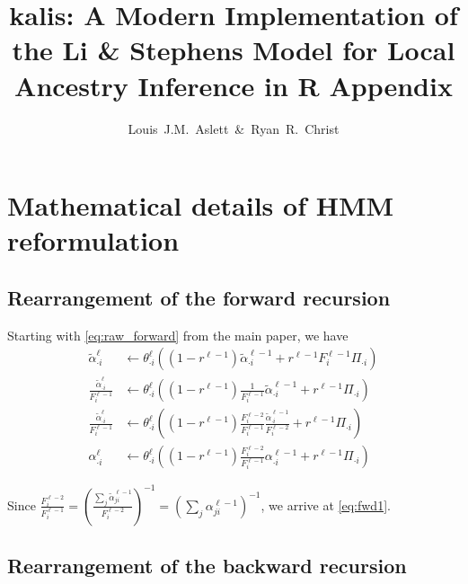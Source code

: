 \documentclass[a4paper]{article}
\title{kalis: A Modern Implementation of the Li \& Stephens Model for Local Ancestry Inference in R \newline Appendix}
\author{Louis~J.M.~Aslett~\&~Ryan~R.~Christ}
\date{}
\begin{document}
\maketitle
\appendix



\section{Mathematical details of HMM reformulation}
\label{mathematical-details-of-hmm-reformulation}



\subsection{Rearrangement of the forward recursion}
\label{apx:fwd}

Starting with \eqref{eq:raw_forward} from the main paper, we have
\begin{align}
	\tilde{\alpha}_{\cdot i}^{\ell} & \gets \theta^{\ell}_{\cdot i}  \left( \left(1-r^{\ell-1}\right) \tilde{\alpha}_{\cdot i}^{\ell-1} + r^{\ell-1} F_i^{\ell-1}  \Pi_{\cdot i} \right) \nonumber \\
	\frac{\tilde{\alpha}_{\cdot i}^{\ell}}{ F_i^{\ell-1}} & \gets \theta^{\ell}_{\cdot i} \left( \left(1-r^{\ell-1}\right) \frac{1}{{ F_i^{\ell-1}}}\tilde{\alpha}_{\cdot i}^{\ell-1} + r^{\ell-1} \Pi_{\cdot i} \right) \nonumber \\
	\frac{\tilde{\alpha}_{\cdot i}^{\ell}}{ F_i^{\ell-1}} & \gets \theta^{\ell}_{\cdot i} \left( \left(1-r^{\ell-1}\right) \frac{F_i^{\ell-2}}{{ F_i^{\ell-1}}} \frac{\tilde{\alpha}_{\cdot i}^{\ell-1}}{F_i^{\ell-2}} + r^{\ell-1} \Pi_{\cdot i} \right) \nonumber \\
	\alpha_{\cdot i}^{\ell} & \gets \theta^{\ell}_{\cdot i} \left( \left(1-r^{\ell-1}\right) \frac{F_i^{\ell-2}}{{ F_i^{\ell-1}}} \alpha_{\cdot i}^{\ell-1} + r^{\ell-1} \Pi_{\cdot i} \right) \nonumber
\end{align}

Since
\(\frac{F_i^{\ell-2}}{F_i^{\ell-1}} = \left( \frac{ \underset{j}{\sum} \tilde{\alpha}_{ji}^{\ell-1}}{ F_i^{\ell-2}}\right)^{-1} = \left( \underset{j}{\sum} \alpha_{ji}^{\ell-1} \right)^{-1}\),
we arrive at \eqref{eq:fwd1}.



\subsection{Rearrangement of the backward recursion}
\label{apx:bck}
\end{document}

